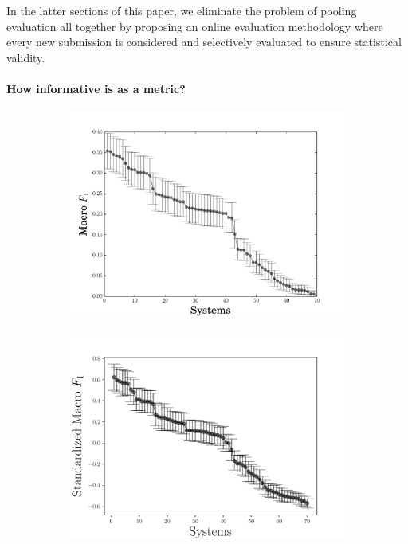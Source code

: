 %
In the latter sections of this paper, we eliminate the problem of pooling evaluation all together by proposing an online evaluation methodology where every new submission is considered and selectively evaluated to ensure statistical validity.

\paragraph{How informative is \fone{} as a metric?}

\begin{figure}
  \begin{subfigure}{0.49\textwidth}
  \includegraphics[width=\columnwidth]{figures/experiment1}
  \caption{\label{fig:f1}}
  \end{subfigure}
  \begin{subfigure}{0.49\textwidth}
  \includegraphics[width=\columnwidth]{figures/experiment3}
  \caption{\label{fig:sf1}}
  \end{subfigure}
  \caption{}
\end{figure}

